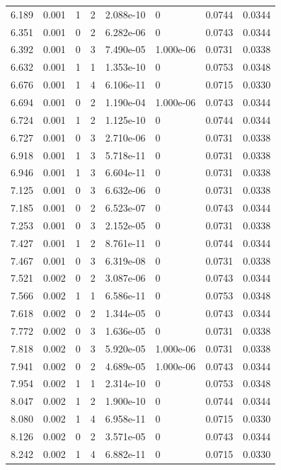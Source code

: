 \documentclass[preview]{standalone}
\begin{document}
{{{\begin{tabular}{L{1.2cm}C{1.2cm} C{0.3cm}C{0.5cm} C{1.4cm}C{1.4cm} C{1.4cm}C{1.4cm}}
  6.189  &  0.001  & 1     &  2 &  2.088e-10  & 0  & 0.0744 &  0.0344   \\ 
  6.351  &  0.001  & 0     &  2 &  6.282e-06  & 0  & 0.0743 &  0.0344   \\ 
  6.392  &  0.001  & 0     &  3 &  7.490e-05  & 1.000e-06  & 0.0731 &  0.0338   \\ 
  6.632  &  0.001  & 1     &  1 &  1.353e-10  & 0  & 0.0753 &  0.0348   \\ 
  6.676  &  0.001  & 1     &  4 &  6.106e-11  & 0  & 0.0715 &  0.0330   \\ 
  6.694  &  0.001  & 0     &  2 &  1.190e-04  & 1.000e-06  & 0.0743 &  0.0344   \\ 
  6.724  &  0.001  & 1     &  2 &  1.125e-10  & 0  & 0.0744 &  0.0344   \\ 
  6.727  &  0.001  & 0     &  3 &  2.710e-06  & 0  & 0.0731 &  0.0338   \\ 
  6.918  &  0.001  & 1     &  3 &  5.718e-11  & 0  & 0.0731 &  0.0338   \\ 
  6.946  &  0.001  & 1     &  3 &  6.604e-11  & 0  & 0.0731 &  0.0338   \\ 
  7.125  &  0.001  & 0     &  3 &  6.632e-06  & 0  & 0.0731 &  0.0338   \\ 
  7.185  &  0.001  & 0     &  2 &  6.523e-07  & 0  & 0.0743 &  0.0344   \\ 
  7.253  &  0.001  & 0     &  3 &  2.152e-05  & 0  & 0.0731 &  0.0338   \\ 
  7.427  &  0.001  & 1     &  2 &  8.761e-11  & 0  & 0.0744 &  0.0344   \\ 
  7.467  &  0.001  & 0     &  3 &  6.319e-08  & 0  & 0.0731 &  0.0338   \\ 
  7.521  &  0.002  & 0     &  2 &  3.087e-06  & 0  & 0.0743 &  0.0344   \\ 
  7.566  &  0.002  & 1     &  1 &  6.586e-11  & 0  & 0.0753 &  0.0348   \\ 
  7.618  &  0.002  & 0     &  2 &  1.344e-05  & 0  & 0.0743 &  0.0344   \\ 
  7.772  &  0.002  & 0     &  3 &  1.636e-05  & 0  & 0.0731 &  0.0338   \\ 
  7.818  &  0.002  & 0     &  3 &  5.920e-05  & 1.000e-06  & 0.0731 &  0.0338   \\ 
  7.941  &  0.002  & 0     &  2 &  4.689e-05  & 1.000e-06  & 0.0743 &  0.0344   \\ 
  7.954  &  0.002  & 1     &  1 &  2.314e-10  & 0  & 0.0753 &  0.0348   \\ 
  8.047  &  0.002  & 1     &  2 &  1.900e-10  & 0  & 0.0744 &  0.0344   \\ 
  8.080  &  0.002  & 1     &  4 &  6.958e-11  & 0  & 0.0715 &  0.0330   \\ 
  8.126  &  0.002  & 0     &  2 &  3.571e-05  & 0  & 0.0743 &  0.0344   \\ 
  8.242  &  0.002  & 1     &  4 &  6.882e-11  & 0  & 0.0715 &  0.0330   \\ 
\hline 
\end{tabular} 

}}}
\end{document}
